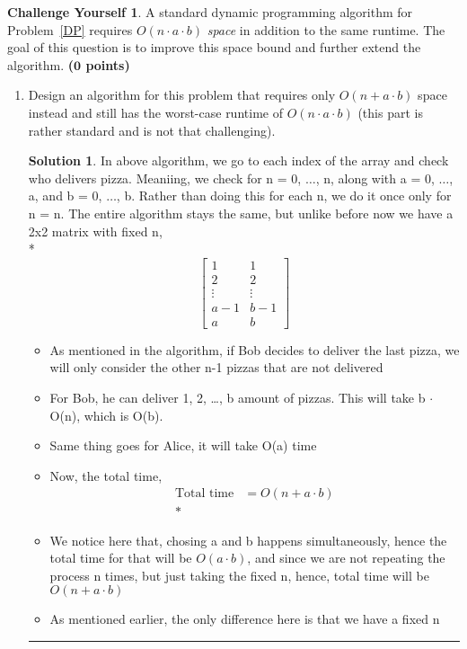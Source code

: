 \documentclass{article}
\theoremstyle{definition}
\newtheorem*{challenge}{Challenge Yourself}
\def\fline{\rule{0.75\linewidth}{0.5pt}}
\newcommand{\finishline}{\vspace{-15pt}\begin{center}\fline\end{center}}
\newtheorem*{solution*}{Solution}
\newenvironment{solution}{\begin{solution*}}{{\finishline} \end{solution*}}
\newcommand{\grade}[1]{\hfill{\textbf{($\mathbf{#1}$ points)}}}
\begin{document}
\begin{challenge}
	A standard dynamic programming algorithm for Problem~\ref{DP} requires $O(n \cdot a \cdot b)$ \emph{space} in addition to the same runtime. The goal of this question is to improve
	this space bound and further extend the algorithm.  \grade{0}
	\begin{enumerate}[label=(\alph*)]
	\item Design an algorithm for this problem that requires only $O(n+a \cdot b)$ space instead and still has the worst-case runtime of $O(n \cdot a \cdot b)$ (this part is rather standard and is not that challenging). 
	\begin{solution}
		In above algorithm, we go to each index of the array and check who delivers pizza. Meaniing, we check for n = 0, $\dots$, n, along with a = 0, $\dots$, a, and b = 0, $\dots$, b. Rather than doing this for each n, we do it once only for n = n. The entire algorithm stays the same, but unlike before now we have a 2x2 matrix with fixed n, \\*
		\[
			\begin{bmatrix}
			    1& 1  \\
			    2&  2 \\
			    \vdots &\vdots \\
			    a-1 &b-1 \\
			    a & b
			\end{bmatrix}
		\]
		\begin{itemize}
		\item As mentioned in the algorithm, if Bob decides to deliver the last pizza, we will only consider the other n-1 pizzas that are not delivered
		\item For Bob, he can deliver 1, 2, \dots, b amount of pizzas. This will take b $\cdot$ O(n), which is O(b).
		\item Same thing goes for Alice, it will take O(a) time
		\item Now, the total time, \\
			\begin{align*}
				{\text{Total time}} &=  O(n + a\cdot b)\\*
			\end{align*}
		\item We notice here that, chosing a and b happens simultaneously, hence the total time for that will be $O(a\cdot b)$, and since we are not repeating the process n times, but just taking the fixed n, hence, total time will be $O(n + a\cdot b)$
		\item As mentioned earlier, the only difference here is that we have a fixed n
		\end{itemize}
	\end{solution}
	\end{enumerate}
	
\end{challenge}
\end{document}
